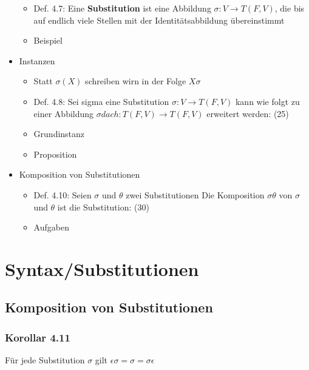 \begin{itemize}
	\begin{itemize}
		\item Def. 4.7: Eine \textbf{Substitution} ist eine Abbildung 					\begin{math} \sigma : V \to T(F,V)\end{math}, die bis auf 					endlich viele Stellen mit der Identitätsabbildung 							übereinstimmt
		\item Beispiel
	\end{itemize}
	\item Instanzen
	\begin{itemize}
		\item Statt \begin{math} \sigma(X) \end{math} schreiben wirn in 				der Folge \begin{math} X\sigma \end{math}
		\item Def. 4.8: Sei sigma eine Substitution \begin{math} \sigma 				: V \to T(F,V)\end{math} kann wie folgt zu einer Abbildung 					\begin{math} \sigma dach: T(F,V) \to T(F,V)\end{math} 						erweitert werden: (25)
		\item Grundinstanz
		\item Proposition
	\end{itemize}
	\item Komposition von Substitutionen
	\begin{itemize}
		\item Def. 4.10: Seien \(\sigma\) und \(\theta\) zwei 							Substitutionen Die 	Komposition \(\sigma\theta\) von 						\(\sigma\) und \(\theta\) ist die Substitution: (30)
		\item Aufgaben
	\end{itemize}
\end{itemize}

\section{Syntax/Substitutionen}
\subsection{Komposition von Substitutionen}
\subsubsection{Korollar 4.11}
Für jede Substitution \(\sigma\) gilt \(\epsilon\sigma = \sigma = \sigma\epsilon \)
